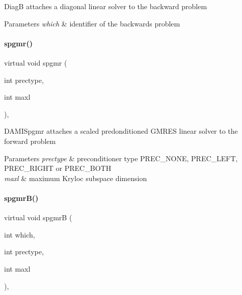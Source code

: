 DiagB attaches a diagonal linear solver to the backward problem


\begin{DoxyParams}{Parameters}
{\em which} & identifier of the backwards problem \\
\hline
\end{DoxyParams}
\mbox{\label{classamici_1_1_solver_a41fd75dd5f9bc7363ca1c1079c2d0014}} 
\paragraph{\texorpdfstring{spgmr()}{spgmr()}}
{\footnotesize\ttfamily virtual void spgmr (\begin{DoxyParamCaption}\item[{int}]{prectype,  }\item[{int}]{maxl }\end{DoxyParamCaption})\hspace{0.3cm}{\ttfamily [protected]}, {}}

D\+A\+M\+I\+Spgmr attaches a scaled predonditioned G\+M\+R\+ES linear solver to the forward problem


\begin{DoxyParams}{Parameters}
{\em prectype} & preconditioner type P\+R\+E\+C\+\_\+\+N\+O\+NE, P\+R\+E\+C\+\_\+\+L\+E\+FT, P\+R\+E\+C\+\_\+\+R\+I\+G\+HT or P\+R\+E\+C\+\_\+\+B\+O\+TH \\
\hline
{\em maxl} & maximum Kryloc subspace dimension \\
\hline
\end{DoxyParams}
\mbox{\label{classamici_1_1_solver_a466c88dd599259b83fe6140e7a454759}} 
\paragraph{\texorpdfstring{spgmr\+B()}{spgmrB()}}
{\footnotesize\ttfamily virtual void spgmrB (\begin{DoxyParamCaption}\item[{int}]{which,  }\item[{int}]{prectype,  }\item[{int}]{maxl }\end{DoxyParamCaption})\hspace{0.3cm}{\ttfamily [protected]}, {}}

